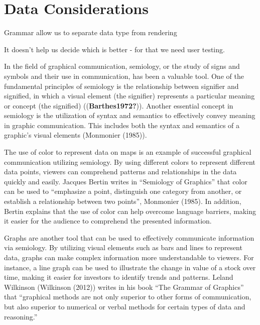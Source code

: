 \documentclass[print]{nuthesis}
\begin{document}

\hypertarget{data-considerations}{%
\section{Data Considerations}\label{data-considerations}}

Grammar allow us to separate data type from rendering


It doesn't help us decide which is better - for that we need user testing.

In the field of graphical communication, semiology, or the study of signs and symbols and their use in communication, has been a valuable tool.
One of the fundamental principles of semiology is the relationship between signifier and signified, in which a visual element (the signifier) represents a particular meaning or concept (the signified) ((\textbf{Barthes1972?})).
Another essential concept in semiology is the utilization of syntax and semantics to effectively convey meaning in graphic communication.
This includes both the syntax and semantics of a graphic's visual elements (Monmonier (1985)).

The use of color to represent data on maps is an example of successful graphical communication utilizing semiology.
By using different colors to represent different data points, viewers can comprehend patterns and relationships in the data quickly and easily.
Jacques Bertin writes in ``Semiology of Graphics'' that color can be used to ``emphasize a point, distinguish one category from another, or establish a relationship between two points'', Monmonier (1985).
In addition, Bertin explains that the use of color can help overcome language barriers, making it easier for the audience to comprehend the presented information.

Graphs are another tool that can be used to effectively communicate information via semiology.
By utilizing visual elements such as bars and lines to represent data, graphs can make complex information more understandable to viewers.
For instance, a line graph can be used to illustrate the change in value of a stock over time, making it easier for investors to identify trends and patterns. Leland Wilkinson (Wilkinson (2012)) writes in his book ``The Grammar of Graphics'' that ``graphical methods are not only superior to other forms of communication, but also superior to numerical or verbal methods for certain types of data and reasoning.''
\end{document}

